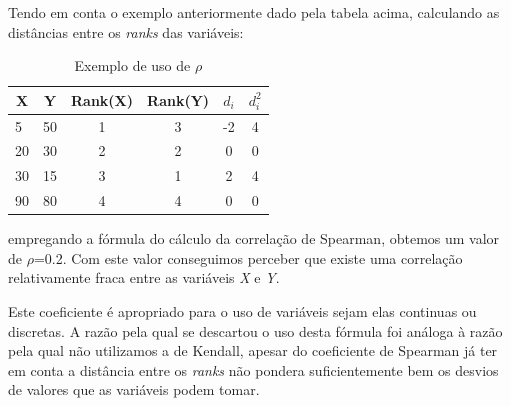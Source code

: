 Tendo em conta o exemplo anteriormente dado pela tabela acima, calculando as distâncias entre os \textit{ranks} das variáveis:
\begin{table}[ht]
	\caption{Exemplo de uso de $\rho$}
	\label{tab:hla:results}
\centering
\begin{tabular}{lccccc}
	\toprule
	\multicolumn{1}{c}{\textbf{X}} 	& \textbf{Y}	& \textbf{Rank(X)}	& \textbf{Rank(Y)} & \textbf{$d_{i}$}	& \textbf{$d_{i}^{2}$} \\
	\midrule
5 & 50 & 1 & 3 & -2 & 4 & \\
20 & 30 & 2 & 2 & 0 & 0 & \\
30 & 15 & 3 & 1 & 2 & 4 & \\
90 & 80 & 4 & 4 & 0 & 0 & \\
	\midrule
\end{tabular}
\end{table}
empregando a fórmula do cálculo da correlação de Spearman, obtemos um valor de $\rho$=0.2. Com este valor conseguimos perceber que existe uma correlação relativamente fraca entre as variáveis \textit{X} e \textit{Y}.

Este coeficiente é apropriado para o uso de variáveis sejam elas continuas ou discretas. A razão pela qual se descartou o uso desta fórmula foi análoga à razão pela qual não utilizamos a de Kendall, apesar do coeficiente de Spearman já ter em conta a distância entre os \textit{ranks} não pondera suficientemente bem os desvios de valores que as variáveis podem tomar. \\

